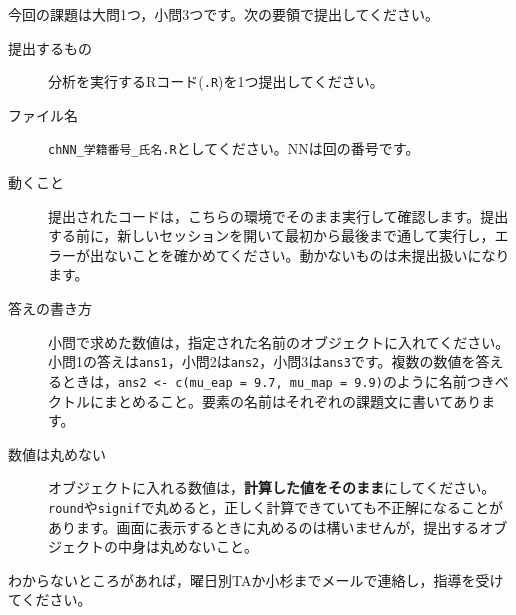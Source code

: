 今回の課題は大問1つ，小問3つです。次の要領で提出してください。
\begin{description}
	\item[提出するもの] 分析を実行するRコード(\texttt{.R})を1つ提出してください。
	\item[ファイル名] \texttt{chNN\_学籍番号\_氏名.R}としてください。NNは回の番号です。
	\item[動くこと] 提出されたコードは，こちらの環境でそのまま実行して確認します。提出する前に，新しいセッションを開いて最初から最後まで通して実行し，エラーが出ないことを確かめてください。動かないものは未提出扱いになります。
	\item[答えの書き方] 小問で求めた数値は，指定された名前のオブジェクトに入れてください。小問1の答えは\verb|ans1|，小問2は\verb|ans2|，小問3は\verb|ans3|です。複数の数値を答えるときは，\verb|ans2 <- c(mu_eap = 9.7, mu_map = 9.9)|のように名前つきベクトルにまとめること。要素の名前はそれぞれの課題文に書いてあります。
	\item[数値は丸めない] オブジェクトに入れる数値は，\textbf{計算した値をそのまま}にしてください。\verb|round|や\verb|signif|で丸めると，正しく計算できていても不正解になることがあります。画面に表示するときに丸めるのは構いませんが，提出するオブジェクトの中身は丸めないこと。
\end{description}
わからないところがあれば，曜日別TAか小杉までメールで連絡し，指導を受けてください。
